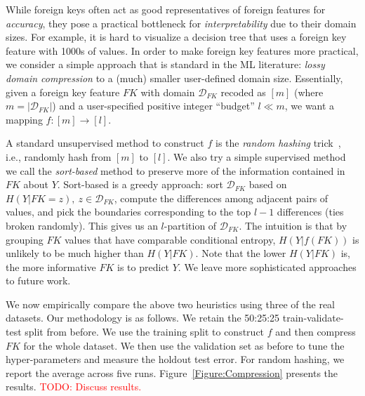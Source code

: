 \documentclass[sigconf]{acmart}
\newcommand{\red}{\textcolor{red}}
\begin{document}
While foreign keys often act as good representatives of foreign features for \textit{accuracy},
they pose a practical bottleneck for \textit{interpretability} due to their domain sizes.
For example, it is hard to visualize a decision tree that uses a foreign key feature with 1000s of values.
In order to make foreign key features more practical, we consider a simple approach that is standard in the ML literature:
\textit{lossy domain compression} to a (much) smaller user-defined domain size. Essentially, given a 
foreign key feature $FK$ with domain $\mathcal{D}_{FK}$ recoded as $[m]$ (where $m = |\mathcal{D}_{FK}|$) and a user-specified 
positive integer ``budget'' $l \ll m$, we want a mapping $f: [m] \rightarrow [l]$.

A standard unsupervised method to construct $f$ is the \textit{random hashing} trick~\cite{hashingtrick}, i.e., randomly hash from $[m]$ to $[l]$.
We also try a simple supervised method we call the \textit{sort-based} method to preserve more of the information contained 
in $FK$ about $Y$. Sort-based is a greedy approach: sort $\mathcal{D}_{FK}$ based on $H(Y|FK=z), ~z \in \mathcal{D}_{FK}$, compute the 
differences among adjacent pairs of values, and pick the boundaries corresponding to the top $l-1$ differences (ties broken randomly). 
This gives us an $l$-partition of $\mathcal{D}_{FK}$. The intuition is that by grouping $FK$ values that have comparable conditional entropy, 
$H(Y|f(FK))$ is unlikely to be much higher than $H(Y|FK)$. Note that the lower $H(Y|FK)$ is, the more informative $FK$ is to predict $Y$. 
We leave more sophisticated approaches to future work.

We now empirically compare the above two heuristics using three of the real datasets. Our methodology is as follows. We retain the 50:25:25 
train-validate-test split from before. We use the training split to construct $f$ and then compress $FK$ for the whole dataset. We then use
the validation set as before to tune the hyper-parameters and measure the holdout test error. For random hashing, we report the average across 
five runs. Figure~\ref{Figure:Compression} presents the results. \red{TODO: Discuss results.}
\end{document}

